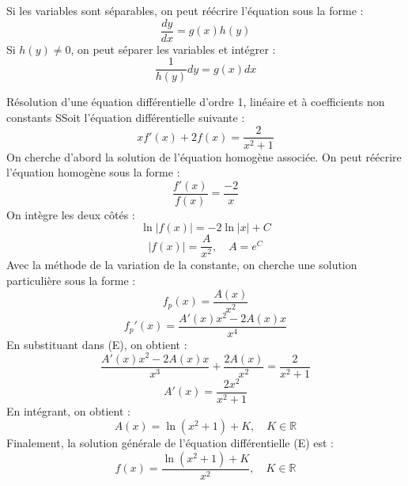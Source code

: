 \documentclass[a4paper,11pt]{article}
\begin{document}
        Si les variables sont séparables, on peut réécrire l'équation sous la forme :
            $$ \frac{dy}{dx} = g(x)h(y) $$
        Si $h(y) \neq 0$, on peut séparer les variables et intégrer :
            $$ \frac{1}{h(y)} dy = g(x) dx $$
        
        \begin{exemple}{Résolution d'une équation différentielle d'ordre 1, linéaire et à coefficients non constants}
            SSoit l'équation différentielle suivante :
            \begin{equation}
                \tag{E}
                x f'(x) + 2f(x) = \frac{2}{x^2+1}
            \end{equation}
            On cherche d'abord la solution de l'équation homogène associée.
            On peut réécrire l'équation homogène sous la forme :
                $$ \frac{f'(x)}{f(x)} = \frac{-2}{x} $$
            On intègre les deux côtés :
                $$ \ln|f(x)| = -2\ln|x| + C $$
                $$ |f(x)| = \frac{A}{x^2}, \quad A = e^C $$
            Avec la méthode de la variation de la constante, on cherche une solution particulière sous la forme :
                $$ f_p(x) = \frac{A(x)}{x^2} $$
                $$ f_p'(x) = \frac{A'(x)x^2 - 2A(x)x}{x^4} $$
            En substituant dans (E), on obtient :
                $$ \frac{A'(x)x^2 - 2A(x)x}{x^3} + \frac{2A(x)}{x^2} = \frac{2}{x^2+1} $$
                $$ A'(x) = \frac{2x^2}{x^2+1} $$
            En intégrant, on obtient :
                $$ A(x) = \ln(x^2+1) + K, \quad K \in \mathbb{R} $$
            Finalement, la solution générale de l'équation différentielle (E) est :
                $$ f(x) = \frac{\ln(x^2+1) + K}{x^2}, \quad K \in \mathbb{R} $$
           
        \end{exemple}
        
        
\end{document}
